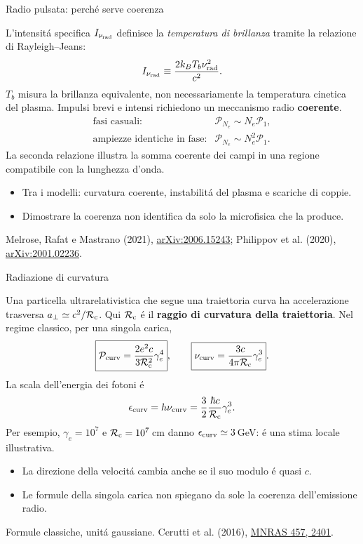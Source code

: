 \begin{frame}[t]{Radio pulsata: perch\'e serve coerenza}
\small\raggedright
L'intensit\'a specifica $I_{\nu_{\rm rad}}$ definisce la
\emph{temperatura di brillanza} tramite la relazione di Rayleigh--Jeans:
\[
I_{\nu_{\rm rad}}\equiv\frac{2k_BT_b\nu_{\rm rad}^2}{c^2}.
\]
$T_b$ misura la brillanza equivalente, non necessariamente
la temperatura cinetica del plasma. Impulsi brevi e intensi richiedono
un meccanismo radio \textbf{coerente}.
\[
\begin{array}{ll}
\text{fasi casuali:} & \mathcal P_{N_e}\sim N_e\mathcal P_1,\\[1mm]
\text{ampiezze identiche in fase:} & \mathcal P_{N_e}\sim N_e^2\mathcal P_1.
\end{array}
\]
La seconda relazione illustra la somma coerente dei campi in una regione
compatibile con la lunghezza d'onda.
\begin{itemize}
\item Tra i modelli: curvatura coerente, instabilit\'a del plasma e scariche di coppie.
\item Dimostrare la coerenza non identifica da solo la microfisica che la produce.
\end{itemize}
\par\smallskip
\footnotesize Melrose, Rafat e Mastrano (2021),
\href{https://arxiv.org/abs/2006.15243}{arXiv:2006.15243};
Philippov et al. (2020), \href{https://arxiv.org/abs/2001.02236}{arXiv:2001.02236}.
\end{frame}

\begin{frame}[t]{Radiazione di curvatura}
\small\raggedright
Una particella ultrarelativistica che segue una traiettoria curva
ha accelerazione trasversa $a_\perp\simeq c^2/\mathcal R_{\rm c}$.
Qui $\mathcal R_{\rm c}$ \'e il \textbf{raggio di curvatura della traiettoria}.
Nel regime classico, per una singola carica,
\[
\boxed{\mathcal P_{\rm curv}=
\frac{2e^2c}{3\mathcal R_{\rm c}^2}\gamma_e^4},\qquad
\boxed{\nu_{\rm curv}=\frac{3c}{4\pi\mathcal R_{\rm c}}\gamma_e^3}.
\]
La scala dell'energia dei fotoni \'e
\[
\epsilon_{\rm curv}=h\nu_{\rm curv}
=\frac32\frac{\hbar c}{\mathcal R_{\rm c}}\gamma_e^3.
\]
Per esempio, $\gamma_e=10^7$ e $\mathcal R_{\rm c}=10^7\,$cm
danno $\epsilon_{\rm curv}\simeq3\,$GeV: \'e una stima locale illustrativa.
\begin{itemize}
\item La direzione della velocit\'a cambia anche se il suo modulo \'e quasi $c$.
\item Le formule della singola carica non spiegano da sole
la coerenza dell'emissione radio.
\end{itemize}
\par\smallskip
\footnotesize Formule classiche, unit\'a gaussiane.
Cerutti et al. (2016),
\href{https://doi.org/10.1093/mnras/stw124}{MNRAS 457, 2401}.
\end{frame}

